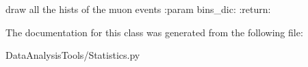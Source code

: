 \begin{DoxyVerb}draw all the hists of the muon events
:param bins_dic:
:return:
\end{DoxyVerb}
 

The documentation for this class was generated from the following file\+:\begin{DoxyCompactItemize}
\item 
Data\+Analysis\+Tools/Statistics.\+py\end{DoxyCompactItemize}
